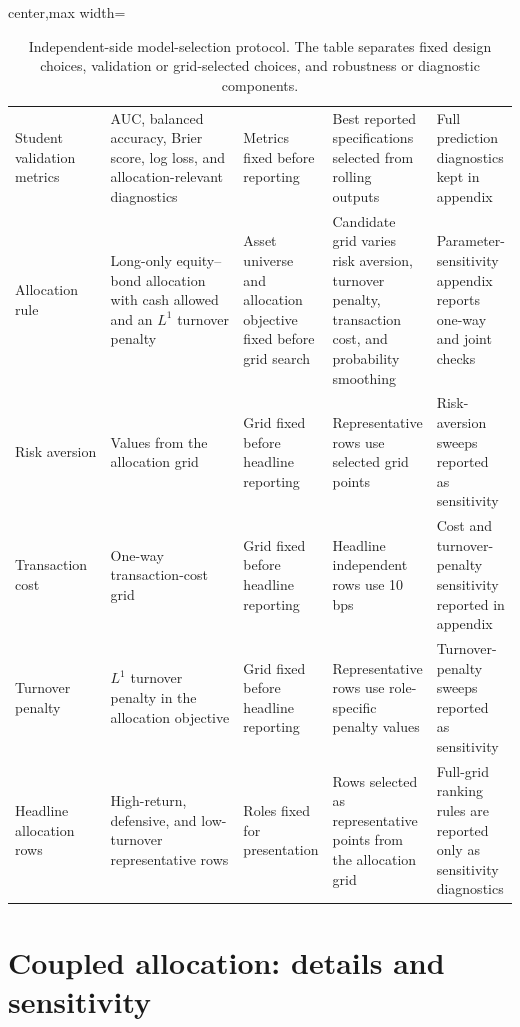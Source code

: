 \begin{table}[H]
\begin{adjustbox}{center,max width=\linewidth}
\begin{tabular}{p{0.20\linewidth}p{0.30\linewidth}p{0.17\linewidth}p{0.18\linewidth}p{0.18\linewidth}}
Student validation metrics & AUC, balanced accuracy, Brier score, log loss, and allocation-relevant diagnostics & Metrics fixed before reporting & Best reported specifications selected from rolling outputs & Full prediction diagnostics kept in appendix \\
Allocation rule & Long-only equity--bond allocation with cash allowed and an $L^1$ turnover penalty & Asset universe and allocation objective fixed before grid search & Candidate grid varies risk aversion, turnover penalty, transaction cost, and probability smoothing & Parameter-sensitivity appendix reports one-way and joint checks \\
Risk aversion & Values from the allocation grid & Grid fixed before headline reporting & Representative rows use selected grid points & Risk-aversion sweeps reported as sensitivity \\
Transaction cost & One-way transaction-cost grid & Grid fixed before headline reporting & Headline independent rows use 10 bps & Cost and turnover-penalty sensitivity reported in appendix \\
Turnover penalty & $L^1$ turnover penalty in the allocation objective & Grid fixed before headline reporting & Representative rows use role-specific penalty values & Turnover-penalty sweeps reported as sensitivity \\
Headline allocation rows & High-return, defensive, and low-turnover representative rows & Roles fixed for presentation & Rows selected as representative points from the allocation grid & Full-grid ranking rules are reported only as sensitivity diagnostics \\
\bottomrule
\end{tabular}
\end{adjustbox}
\caption{Independent-side model-selection protocol. The table separates fixed design choices,
validation or grid-selected choices, and robustness or diagnostic components.}
\label{tab:independent-model-selection-protocol}
\end{table}

\FloatBarrier




\section{Coupled allocation: details and sensitivity}
\label{app:alloc-coupled}

